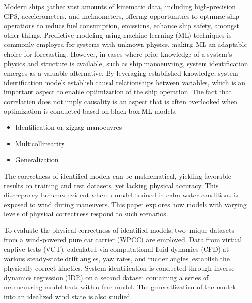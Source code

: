 Modern ships gather vast amounts of kinematic data, including high-precision GPS, accelerometers, and inclinometers, offering opportunities to optimize ship operations to reduce fuel consumption, emissions, enhance ship safety, amongst other things. Predictive modeling using machine learning (ML) techniques is commonly employed for systems with unknown physics, making ML an adaptable choice for forecasting. However, in cases where prior knowledge of a system's physics and structure is available, such as ship manoeuvring, system identification emerges as a valuable alternative. By leveraging established knowledge, system identification models establish causal relationships between variables, which is an important aspect to enable optimization of the ship operation. The fact that correlation does not imply causality is an aspect that is often overlooked when optimization is conducted based on black box ML models.
\begin{itemize}
    \item Identification on zigzag manoeuvres
\end{itemize}

%
\begin{itemize}
    \item Multicollinearity
    \item Generalization
\end{itemize}
The correctness of identified models can be mathematical, yielding favorable results on training and test datasets, yet lacking physical accuracy. This discrepancy becomes evident when a model trained in calm water conditions is exposed to wind during maneuvers. This paper explores how models with varying levels of physical correctness respond to such scenarios.

%
To evaluate the physical correctness of identified models, two unique datasets from a wind-powered pure car carrier (WPCC) are employed. Data from virtual captive tests (VCT), calculated via computational fluid dynamics (CFD) at various steady-state drift angles, yaw rates, and rudder angles, establish the physically correct kinetics. System identification is conducted through inverse dynamics regression (IDR) on a second dataset containing a series of manoeuvring model tests with a free model. The generatlization of the models into an idealized wind state is also studied. 

